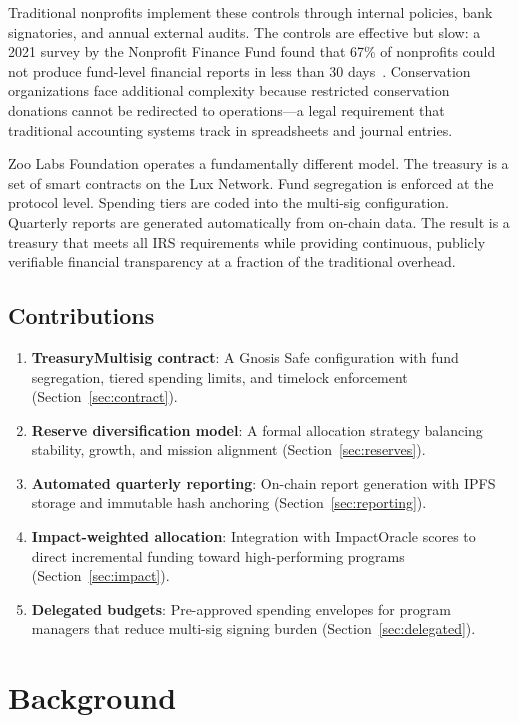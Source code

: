 \documentclass[11pt,letterpaper]{article}
\begin{document}
Traditional nonprofits implement these controls through internal policies, bank signatories, and annual external audits. The controls are effective but slow: a 2021 survey by the Nonprofit Finance Fund found that 67\% of nonprofits could not produce fund-level financial reports in less than 30 days~\cite{nff2021}. Conservation organizations face additional complexity because restricted conservation donations cannot be redirected to operations---a legal requirement that traditional accounting systems track in spreadsheets and journal entries.

Zoo Labs Foundation operates a fundamentally different model. The treasury is a set of smart contracts on the Lux Network. Fund segregation is enforced at the protocol level. Spending tiers are coded into the multi-sig configuration. Quarterly reports are generated automatically from on-chain data. The result is a treasury that meets all IRS requirements while providing continuous, publicly verifiable financial transparency at a fraction of the traditional overhead.

\subsection{Contributions}

\begin{enumerate}
    \item \textbf{TreasuryMultisig contract}: A Gnosis Safe configuration with fund segregation, tiered spending limits, and timelock enforcement (Section~\ref{sec:contract}).
    \item \textbf{Reserve diversification model}: A formal allocation strategy balancing stability, growth, and mission alignment (Section~\ref{sec:reserves}).
    \item \textbf{Automated quarterly reporting}: On-chain report generation with IPFS storage and immutable hash anchoring (Section~\ref{sec:reporting}).
    \item \textbf{Impact-weighted allocation}: Integration with ImpactOracle scores to direct incremental funding toward high-performing programs (Section~\ref{sec:impact}).
    \item \textbf{Delegated budgets}: Pre-approved spending envelopes for program managers that reduce multi-sig signing burden (Section~\ref{sec:delegated}).
\end{enumerate}

\section{Background}
\end{document}
